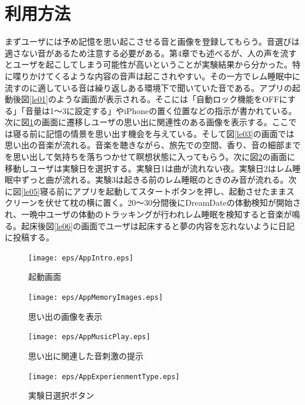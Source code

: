 \section{利用方法}
まずユーザには予め記憶を思い起こさせる音と画像を登録してもらう。音選びは適さない音があるため注意する必要がある。第4章でも述べるが、人の声を流すとユーザを起こしてしまう可能性が高いということが実験結果から分かった。特に喋りかけてくるような内容の音声は起こされやすい。その一方でレム睡眠中に流すのに適している音は繰り返しある環境下で聞いていた音である。アプリの起動後図\ref{le01}のような画面が表示される。そこには「自動ロック機能をOFFにする」「音量は1〜3に設定する」やiPhoneの置く位置などの指示が書かれている。次に図\ref{le02}の画面に遷移しユーザの思い出に関連性のある画像を表示する。ここでは寝る前に記憶の情景を思い出す機会を与えている。そして図\ref{le03}の画面では思い出の音楽が流れる。音楽を聴きながら、旅先での空間、香り、音の細部までを思い出して気持ちを落ちつかせて瞑想状態に入ってもらう。次に図\ref{le04}の画面に移動しユーザは実験日を選択する。実験日1は曲が流れない夜。実験日2はレム睡眠中ずっと曲が流れる。実験3は起きる前のレム睡眠のときのみ音が流れる。次に図\ref{le05}寝る前にアプリを起動してスタートボタンを押し、起動させたままスクリーンを伏せて枕の横に置く。20〜30分間後にDreamDateの体動検知が開始され、一晩中ユーザの体動のトラッキングが行われレム睡眠を検知すると音楽が鳴る。起床後図\ref{le06}の画面でユーザは起床すると夢の内容を忘れないように日記に投稿する。

\begin{figure}[htbp]
 \begin{minipage}{0.45\hsize}
  \begin{center}
   \texttt{[image: eps/AppIntro.eps]}
  \end{center}
  \caption{起動画面}
  \label{le01}
 \end{minipage}
  \begin{minipage}{0.45\hsize}
  \begin{center}
   \texttt{[image: eps/AppMemoryImages.eps]}
  \end{center}
  \caption{思い出の画像を表示}
  \label{le02}
 \end{minipage}
\end{figure}
\begin{figure}[htbp]
 \begin{minipage}{0.45\hsize}
  \begin{center}
   \texttt{[image: eps/AppMusicPlay.eps]}
  \end{center}
  \caption{思い出に関連した音刺激の提示}
  \label{le03}
 \end{minipage}
 \begin{minipage}{0.45\hsize}
  \begin{center}
   \texttt{[image: eps/AppExperienmentType.eps]}
  \end{center}
  \caption{実験日選択ボタン}
  \label{le04}
 \end{minipage}
\end{figure}

